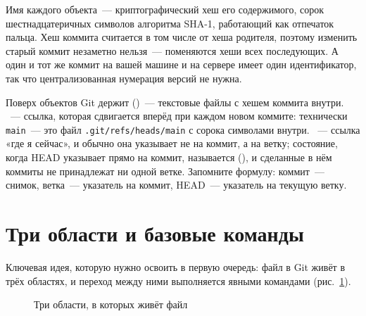 Имя каждого объекта~--- криптографический хеш его содержимого, сорок шестнадцатеричных символов алгоритма SHA-1, работающий как отпечаток пальца. Хеш коммита считается в том числе от хеша родителя, поэтому изменить старый коммит незаметно нельзя~--- поменяются хеши всех последующих. А один и тот же коммит на вашей машине и на сервере имеет один идентификатор, так что централизованная нумерация версий не нужна.

Поверх объектов Git держит  ()~--- текстовые файлы с хешем коммита внутри. ~--- ссылка, которая сдвигается вперёд при каждом новом коммите: технически \texttt{main}~--- это файл \texttt{.git/refs/heads/main} с сорока символами внутри. ~--- ссылка «где я сейчас», и обычно она указывает не на коммит, а на ветку; состояние, когда HEAD указывает прямо на коммит, называется  (), и сделанные в нём коммиты не принадлежат ни одной ветке. Запомните формулу: коммит~--- снимок, ветка~--- указатель на коммит, HEAD~--- указатель на текущую ветку.

\section{Три области и базовые команды}

Ключевая идея, которую нужно освоить в первую очередь: файл в Git живёт в трёх
областях, и переход между ними выполняется явными командами
(рис.~\ref{fig:12-2}).

\begin{figure}[htbp]\centering
{}
\caption{Три области, в которых живёт файл}\label{fig:12-2}
\end{figure}

